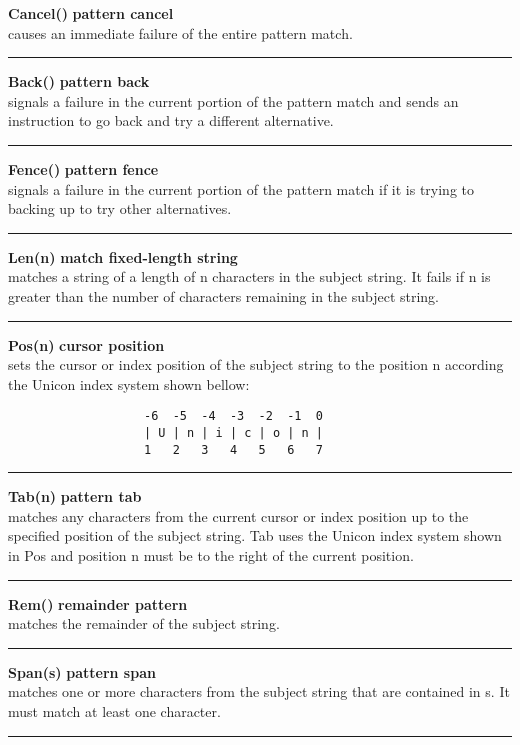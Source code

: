 \documentclass{article}
\begin{document}
\noindent\textbf{Cancel()} \hfill\textbf{pattern cancel}\\
causes an immediate failure of the entire pattern match.\\
\noindent\rule{12cm}{0.1pt}

\noindent\textbf{Back()} \hfill\textbf{pattern back}\\
signals a failure in the current portion of the pattern match and sends an instruction to go back and try a different alternative.\\
\noindent\rule{12cm}{0.1pt}

\noindent\textbf{Fence()} \hfill\textbf{pattern fence}\\
signals a failure in the current portion of the pattern match if it is trying to backing up to try other alternatives.\\
\noindent\rule{12cm}{0.1pt}

\noindent\textbf{Len(n)} \hfill\textbf{match fixed-length string}\\
matches a string of a length of n characters in the subject string.  It fails if n is greater than the number of characters remaining in the subject string.\\
\noindent\rule{12cm}{0.1pt}

\noindent\textbf{Pos(n)} \hfill\textbf{cursor position}\\
sets the cursor or index position of the subject string to the position n according the Unicon index system shown bellow:
\begin{verbatim}
                   -6  -5  -4  -3  -2  -1  0
                   | U | n | i | c | o | n |
                   1   2   3   4   5   6   7
\end{verbatim}
\noindent\rule{12cm}{0.1pt}

\noindent\textbf{Tab(n)} \hfill\textbf{pattern tab}\\
matches any characters from the current cursor or index position up to the specified position of the subject string. Tab uses the Unicon index system shown in Pos and position n must be to the right of the current position.\\
\noindent\rule{12cm}{0.1pt}

\noindent\textbf{Rem()} \hfill\textbf{remainder pattern}\\
matches the remainder of the subject string.\\
\noindent\rule{12cm}{0.1pt}

\noindent\textbf{Span(s)} \hfill\textbf{pattern span}\\
matches one or more characters from the subject string that are contained in s.  It must match at least one character.\\
\noindent\rule{12cm}{0.1pt}
\end{document}

